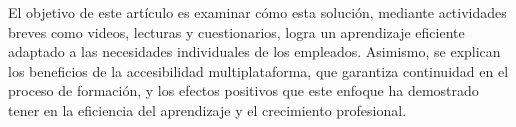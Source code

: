 El objetivo de este artículo es examinar cómo esta solución, mediante
actividades breves como videos, lecturas y cuestionarios, logra un aprendizaje
eficiente adaptado a las necesidades individuales de los empleados. Asimismo, se
explican los beneficios de la accesibilidad multiplataforma, que garantiza
continuidad en el proceso de formación, y los efectos positivos que este enfoque
ha demostrado tener en la eficiencia del aprendizaje y el crecimiento
profesional.
